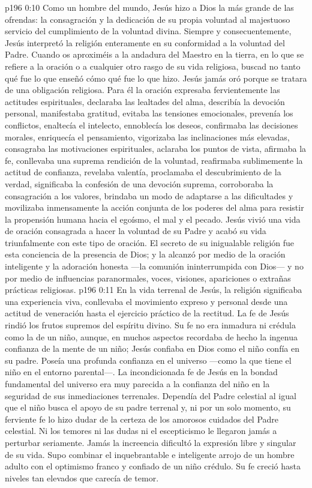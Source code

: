 \vs p196 0:10 Como un hombre del mundo, Jesús hizo a Dios la más grande de las ofrendas: la consagración y la dedicación de su propia voluntad al majestuoso servicio del cumplimiento de la voluntad divina. Siempre y consecuentemente, Jesús interpretó la religión enteramente en su conformidad a la voluntad del Padre. Cuando os aproximéis a la andadura del Maestro en la tierra, en lo que se refiere a la oración o a cualquier otro rasgo de su vida religiosa, buscad no tanto qué fue lo que enseñó cómo qué fue lo que hizo. Jesús jamás oró porque se tratara de una obligación religiosa. Para él la oración expresaba fervientemente las actitudes espirituales, declaraba las lealtades del alma, describía la devoción personal, manifestaba gratitud, evitaba las tensiones emocionales, prevenía los conflictos, enaltecía el intelecto, ennoblecía los deseos, confirmaba las decisiones morales, enriquecía el pensamiento, vigorizaba las inclinaciones más elevadas, consagraba las motivaciones espirituales, aclaraba los puntos de vista, afirmaba la fe, conllevaba una suprema rendición de la voluntad, reafirmaba sublimemente la actitud de confianza, revelaba valentía, proclamaba el descubrimiento de la verdad, significaba la confesión de una devoción suprema, corroboraba la consagración a los valores, brindaba un modo de adaptarse a las dificultades y movilizaba inmensamente la acción conjunta de los poderes del alma para resistir la propensión humana hacia el egoísmo, el mal y el pecado. Jesús vivió una vida de oración consagrada a hacer la voluntad de su Padre y acabó su vida triunfalmente con este tipo de oración. El secreto de su inigualable religión fue esta conciencia de la presencia de Dios; y la alcanzó por medio de la oración inteligente y la adoración honesta ---la comunión ininterrumpida con Dios--- y no por medio de influencias paranormales, voces, visiones, apariciones o extrañas prácticas religiosas.
\vs p196 0:11 En la vida terrenal de Jesús, la religión significaba una experiencia viva, conllevaba el movimiento expreso y personal desde una actitud de veneración hasta el ejercicio práctico de la rectitud. La fe de Jesús rindió los frutos supremos del espíritu divino. Su fe no era inmadura ni crédula como la de un niño, aunque, en muchos aspectos recordaba de hecho la ingenua confianza de la mente de un niño; Jesús confiaba en Dios como el niño confía en su padre. Poseía una profunda confianza en el universo ---como la que tiene el niño en el entorno parental---. La incondicionada fe de Jesús en la bondad fundamental del universo era muy parecida a la confianza del niño en la seguridad de sus inmediaciones terrenales. Dependía del Padre celestial al igual que el niño busca el apoyo de su padre terrenal y, ni por un solo momento, su ferviente fe lo hizo dudar de la certeza de los amorosos cuidados del Padre celestial. Ni los temores ni las dudas ni el escepticismo le llegaron jamás a perturbar seriamente. Jamás la increencia dificultó la expresión libre y singular de su vida. Supo combinar el inquebrantable e inteligente arrojo de un hombre adulto con el optimismo franco y confiado de un niño crédulo. Su fe creció hasta niveles tan elevados que carecía de temor.
